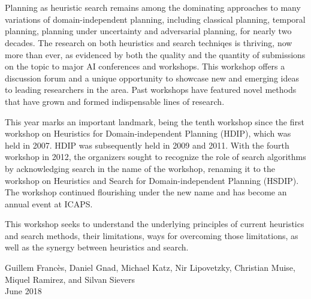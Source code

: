 \section*{}
Planning as heuristic search remains among the dominating approaches to many
variations of domain-independent planning, including classical planning,
temporal planning, planning under uncertainty and adversarial planning, for
nearly two decades. The research on both heuristics and search techniqes is
thriving, now more than ever, as evidenced by both the quality and the quantity
of submissions on the topic to major AI conferences and workshops. This
workshop offers a discussion forum and a unique  opportunity to showcase new
and emerging ideas to leading researchers in the area. Past workshops have
featured novel methods that have grown and formed indispensable lines of
research.

This year marks an important landmark, being the tenth workshop since the first
workshop on Heuristics for Domain-independent Planning (HDIP), which was held in
2007.
HDIP was subsequently held in 2009 and 2011. With the fourth workshop in 2012,
the organizers sought to recognize the role of search algorithms by
acknowledging search in the name of the workshop, renaming it to the workshop
on Heuristics and Search for Domain-independent Planning (HSDIP). The workshop
continued flourishing under the new name and has become an annual event at
ICAPS. 


This workshop seeks to understand the underlying principles of current
heuristics and search methods, their limitations, ways for overcoming those
limitations, as well as the synergy between heuristics and search. 


\bigskip
\begin{flushright}
Guillem Franc\`es, 
Daniel Gnad, 
Michael Katz,  
Nir Lipovetzky, 
Christian Muise, 
Miquel Ramirez, and Silvan Sievers
\\
June 2018
\end{flushright}
